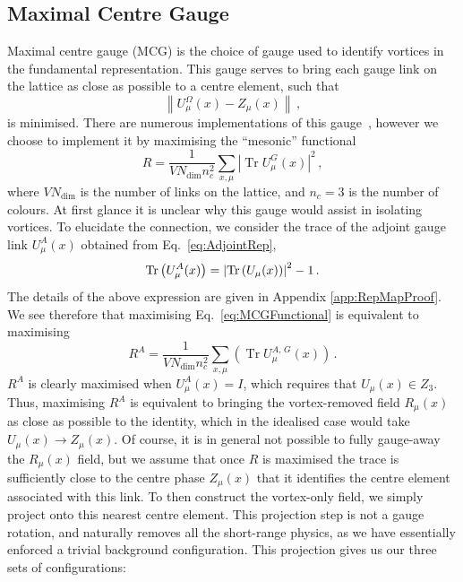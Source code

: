 \subsection{Maximal Centre Gauge}\label{sec:MCG}
Maximal centre gauge (MCG) is the choice of gauge used to identify vortices in the fundamental representation. This gauge serves to bring each gauge link on the lattice as close as possible to a centre element, such that
%
\begin{equation}
\left\| U _ { \mu } ^ { \Omega } ( x ) - Z _ { \mu } ( x ) \right\|\, ,
\end{equation}
%
is minimised. There are numerous implementations of this gauge~\cite{Montero:1999by,Faber:1999sq}, however we choose to implement it by maximising the ``mesonic'' functional~\cite{Langfeld:2003ev}
%
\begin{equation}
R = \frac { 1 } { V N _ { \operatorname { dim } } n _ { c } ^ { 2 } } \sum _ { x , \mu } \left| \operatorname { Tr } U _ { \mu } ^ { G } ( x ) \right| ^ { 2 }\, ,
\label{eq:MCGFunctional}
\end{equation} 
%
where $VN _ { \operatorname { dim } }$ is the number of links on the lattice, and $n_c=3$ is the number of colours. At first glance it is unclear why this gauge would assist in isolating vortices. To elucidate the connection, we consider the trace of the adjoint gauge link $U^A_\mu(x)$ obtained from Eq.~\ref{eq:AdjointRep},
%
\begin{equation}
\operatorname{Tr}\left(U^A_\mu(x)\right) = \left|\operatorname{Tr}\left(U_\mu(x)\right)\right|^2 - 1\, .
\end{equation}
%
The details of the above expression are given in Appendix \ref{app:RepMapProof}. We see therefore that maximising Eq.~\ref{eq:MCGFunctional} is equivalent to maximising
%
\begin{equation}
R^A = \frac { 1 } { V N _ { \operatorname { dim } } n _ { c } ^ { 2 } } \sum _ { x , \mu } \left( \operatorname { Tr } U _ { \mu } ^ { A,\,G } ( x ) \right)\, .
\end{equation}
%
$R^A$ is clearly maximised when $U_\mu^A(x)=I$, which requires that $U_\mu(x) \in Z_3$. Thus, maximising $R^A$ is equivalent to bringing the vortex-removed field $R_\mu(x)$ as close as possible to the identity, which in the idealised case would take $U_\mu(x)\rightarrow Z_\mu(x)$. Of course, it is in general not possible to fully gauge-away the $R_\mu(x)$ field, but we assume that once $R$ is maximised the trace is sufficiently close to the centre phase $Z_\mu(x)$ that it identifies the centre element associated with this link. To then construct the vortex-only field, we simply project onto this nearest centre element. This projection step is not a gauge rotation, and naturally removes all the short-range physics, as we have essentially enforced a trivial background configuration. This projection gives us our three sets of configurations:
